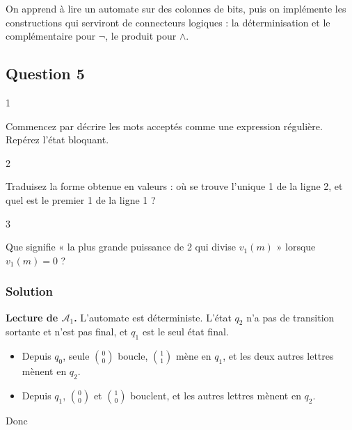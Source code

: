 \documentclass[11pt,a4paper]{article}
\providecommand{\tightlist}{\setlength{\itemsep}{0pt}\setlength{\parskip}{0pt}}
\newcommand{\equationajustee}[1]{%
  \sbox{\boiteequation}{$\displaystyle #1$}%
  \ifdim\wd\boiteequation>\linewidth
    \[\resizebox{\linewidth}{!}{\usebox{\boiteequation}}\]%
  \else
    \[#1\]%
  \fi}
\begin{document}
On apprend à lire un automate sur des colonnes de bits, puis on implémente les constructions qui serviront de connecteurs logiques : la déterminisation et le complémentaire pour \(\neg\), le produit pour \(\wedge\).

\hypertarget{question-5}{%
\subsection{Question 5}\label{question-5}}

\begin{indication}{1}

Commencez par décrire les mots acceptés comme une expression régulière. Repérez l'état bloquant.

\end{indication}

\begin{indication}{2}

Traduisez la forme obtenue en valeurs : où se trouve l'unique 1 de la ligne 2, et quel est le premier 1 de la ligne 1 ?

\end{indication}

\begin{indication}{3}

Que signifie « la plus grande puissance de 2 qui divise \(v_1(m)\) » lorsque \(v_1(m)=0\) ?

\end{indication}

\hypertarget{solution-4}{%
\subsubsection{Solution}\label{solution-4}}

\textbf{Lecture de \({\mathcal{A}}_1\).} L'automate est déterministe. L'état \(q_2\) n'a pas de transition sortante et n'est pas final, et \(q_1\) est le seul état final.

\begin{itemize}
\tightlist
\item
  Depuis \(q_0\), seule \(\binom00\) boucle, \(\binom11\) mène en \(q_1\), et les deux autres lettres mènent en \(q_2\).
\item
  Depuis \(q_1\), \(\binom00\) et \(\binom10\) bouclent, et les autres lettres mènent en \(q_2\).
\end{itemize}

Donc
\equationajustee{\mathcal{L}({\mathcal{A}}_1)=\Big\{\tbinom00^k\,\tbinom11\,s\ :\ k\in\mathbb{N},\ s\in\big\{\tbinom00,\tbinom10\big\}^*\Big\}.\qquad(\star)}
\end{document}
